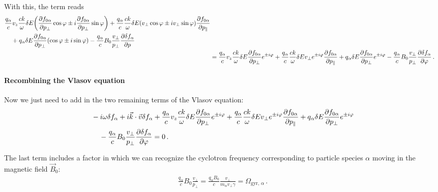 \documentclass[main.tex]{subfiles}
\begin{document}
With this, the term reads 
%
\begin{align}
\begin{split}
& \frac{q_\alpha }{c} v_z \frac{ck}{\omega } \delta E \qty(
    \pdv{f_{0 \alpha }}{p_\perp} \cos \varphi 
    \pm i \pdv{f_{0 \alpha }}{p_\perp} \sin \varphi 
)
+ \frac{q_\alpha}{c} \frac{ck}{\omega } \delta E
\qty(v_\perp \cos \varphi \pm i v_\perp \sin \varphi )
\pdv{f_{0 \alpha }}{p_\parallel} 
\\
&\phantom{=}\ 
+ q_\alpha \delta E \pdv{f_{0 \alpha }}{p_\perp} \qty(\cos \varphi \pm i \sin \varphi )  
- \frac{q_\alpha}{c} B_0 \frac{v_\perp}{p_\perp} \pdv{ \delta f_\alpha }{p}
\end{split}  \\
&= \frac{q_\alpha }{c} v_z \frac{ck}{\omega } \delta E 
    \pdv{f_{0 \alpha }}{p_\perp} e^{\pm i \varphi }
+ \frac{q_\alpha}{c} \frac{ck}{\omega } \delta E
v_\perp e^{\pm i \varphi }
\pdv{f_{0 \alpha }}{p_\parallel} 
+ q_\alpha \delta E \pdv{f_{0 \alpha }}{p_\perp} e^{\pm i \varphi } 
- \frac{q_\alpha}{c} B_0 \frac{v_\perp}{p_\perp} \pdv{ \delta f_\alpha }{\varphi }
\,.
\end{align}

\paragraph{Recombining the Vlasov equation}

Now we just need to add in the two remaining terms of the Vlasov equation: 
%
\begin{align}
\begin{split}
&
- i \omega \delta f_\alpha 
+ i \vec{k} \cdot \vec{v} \delta f_\alpha + 
\frac{q_\alpha }{c} v_z \frac{ck}{\omega } \delta E 
    \pdv{f_{0 \alpha }}{p_\perp} e^{\pm i \varphi }
+ \frac{q_\alpha}{c} \frac{ck}{\omega } \delta E
v_\perp e^{\pm i \varphi }
\pdv{f_{0 \alpha }}{p_\parallel} 
+ q_\alpha \delta E \pdv{f_{0 \alpha }}{p_\perp} e^{\pm i \varphi } 
\\
&\phantom{=}\ 
- \frac{q_\alpha}{c} B_0 \frac{v_\perp}{p_\perp} \pdv{ \delta f_\alpha }{\varphi } = 0
\,.
\end{split}
\end{align}

The last term includes a factor in which we can recognize the cyclotron frequency corresponding to particle species \(\alpha \) moving in the magnetic field \(\vec{B}_0\): 
%
\begin{align}
\frac{q_\alpha}{c} B_0 \frac{v_\perp}{p_\perp} = \frac{q_\alpha B_0 }{c} \frac{v_\perp}{m_\alpha v_\perp \gamma } = \Omega _{\text{gyr, }\alpha }
\,.
\end{align}
\end{document}
